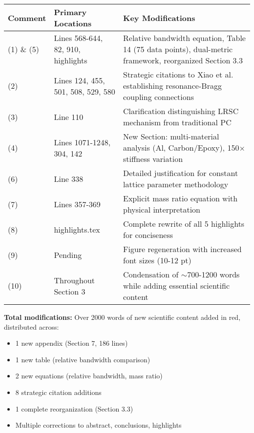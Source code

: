 \documentclass[11pt,a4paper]{article}
\begin{document}
\begin{table}[h]
\centering
\small
\begin{tabular}{|p{2cm}|p{4cm}|p{7cm}|}
\hline
\textbf{Comment} & \textbf{Primary Locations} & \textbf{Key Modifications} \\
\hline
(1) \& (5) & Lines 568-644, 82, 910, highlights & Relative bandwidth equation, Table 14 (75 data points), dual-metric framework, reorganized Section 3.3 \\
\hline
(2) & Lines 124, 455, 501, 508, 529, 580 & Strategic citations to Xiao et al. establishing resonance-Bragg coupling connections \\
\hline
(3) & Line 110 & Clarification distinguishing LRSC mechanism from traditional PC \\
\hline
(4) & Lines 1071-1248, 304, 142 & New Section: multi-material analysis (Al, Carbon/Epoxy), 150$\times$ stiffness variation \\
\hline
(6) & Line 338 & Detailed justification for constant lattice parameter methodology \\
\hline
(7) & Lines 357-369 & Explicit mass ratio equation with physical interpretation \\
\hline
(8) & highlights.tex & Complete rewrite of all 5 highlights for conciseness \\
\hline
(9) & Pending & Figure regeneration with increased font sizes (10-12 pt) \\
\hline
(10) & Throughout Section 3 & Condensation of $\sim$700-1200 words while adding essential scientific content \\
\hline
\end{tabular}
\end{table}

\textbf{Total modifications:} Over 2000 words of new scientific content added in red, distributed across:
\begin{itemize}
    \item 1 new appendix (Section 7, 186 lines)
    \item 1 new table (relative bandwidth comparison)
    \item 2 new equations (relative bandwidth, mass ratio)
    \item 8 strategic citation additions
    \item 1 complete reorganization (Section 3.3)
    \item Multiple corrections to abstract, conclusions, highlights
\end{itemize}
\end{document}
